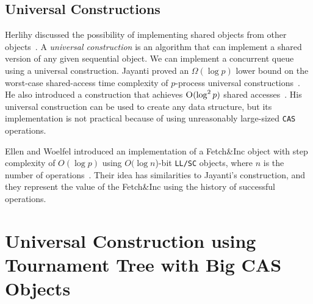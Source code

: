\documentclass[10pt]{article}
\theoremstyle{definition}
\begin{document}
\subsection{Universal Constructions}
Herlihy discussed the possibility of implementing shared objects from other objects~\cite{10.1145/114005.102808}. A \textit{universal construction} is an algorithm that can implement a shared version of any given sequential object. We can implement a concurrent queue using a universal construction. Jayanti proved an $\Omega(\log p)$ lower bound on the worst-case shared-access time complexity of $p$-process universal constructions~\cite{DBLP:conf/podc/Jayanti98a}. He also introduced a construction that achieves $\textsc{O}(\log^2 p)$ shared accesses~\cite{DBLP:conf/podc/ChandraJT98}. His universal construction can be used to create any data structure, but its implementation is not practical because of using unreasonably large-sized \texttt{CAS} operations.

Ellen and Woelfel introduced an implementation of a Fetch\&Inc object with step complexity of $O(\log p)$ using $O(\log n$)-bit \texttt{LL/SC} objects, where $n$ is the number of operations~\cite{10.1007/978-3-642-41527-2_20}. Their idea has similarities to Jayanti's construction, and they represent the value of the Fetch\&Inc using the history of successful operations. 




\pagebreak
\section{ Universal Construction using Tournament Tree with Big CAS Objects }
\end{document}
